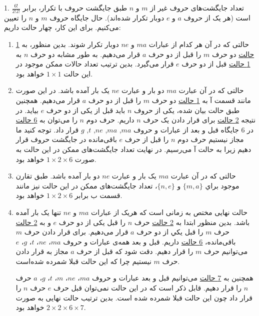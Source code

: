   
    1. 
    \p
    تعداد جایگشت‌های حروف غیر از $m$ و $n$ طبق جایگشت حروف با تکرار، برابر $\frac{6!}{2!2!}$ است
    (هر یک از حروف $a$ و $e$ دوبار تکرار شده‌اند).
    حال جایگاه حروف $m$ و $n$ را تعیین می‌کنیم.
    برای این کار، چهار حالت داریم:
    \begin{enumerate}
      \item 
      حالتی که در آن هر کدام از عبارات $ma$ و $ne$
      دوبار تکرار شوند. بدین منظور، به
      \underline{1 حالت} 
       دو حرف 
      $m$ 
      را قبل از دو حرف 
      $a$
      قرار می‌دهیم.
      به طور مشابه دو حرف
       $n$ 
     به
     \underline{1 حالت}
       قبل از دو حرف 
       $e$
       قرار می‌گیرد.
      بدین ترتیب تعداد حالات ممکن موجود در این حالت 
      $1\times1$
      خواهد بود.
      
      \item
      حالتی که در آن عبارت $ma$ دو بار و عبارت $ne$ 
      یک بار آمده باشد. در این صورت مانند قسمت آ به
      \underline{1 حالت}  
       دو حرف 
      $m$
      را قبل از دو حرف 
      $a$
      قرار می‌دهیم.
      همچنین طبق حالت بیان شده، یکی از حروف 
      $n$ باید قبل از یکی از دو حرف $e$
      بیاید. در نتیجه
      \underline{2 حالت}
      برای قرار دادن یک حرف $n$ داریم. 
       حرف دوم 
      $n$
      را می‌توان به 
      \underline{6 حالت}
       در 6 جایگاه قبل و بعد از عبارات و حروف
      $ma$, 
      $ma$, 
      $ne$, 
      $t$,   
      $g$
      قرار داد.
      توجه کنید ما مجاز نیستیم حرف دوم
      $n$
      را قبل از حرف $e$
      باقی‌مانده در جایگشت حروف قرار دهیم زیرا به حالت آ می‌رسیم.
     در نهایت تعداد جایگشت‌های ممکن در این حالت به صورت 
      $1\times 2\times 6$
      خواهد بود.

      \item
      حالتی که در آن عبارت $ma$ یک بار و عبارت $ne$
    دو بار آمده باشد.
      طبق تقارن موجود براي 
      $\{m,a\}$ و
      $\{n,e\}$، 
    تعداد جایگشت‌های ممکن در این حالت نیز مانند قسمت ب برابر 
    $1\times 2\times 6$ 
      خواهد بود.
      
      \item
      حالت نهایی مختص به زمانی است که هریک از عبارات $ma$ و $ne$ تنها یک بار آمده باشد.
      بدین منظور ابتدا به
      \underline{2 حالت}
      حرف 
      $n$
      را قبل یکی از دو حرف 
      $e$
      و به
      \underline{2 حالت}  
      حرف  
      $m$
      را قبل يكي از دو حرف 
      $a$ 
      قرار می‌دهیم.
      برای قرار دادن حرف $m$ باقی‌مانده،
      \underline{6 حالت} 
       داریم.
      قبل و بعد همه‌ی عبارات و حروف 
      $ma$، $ne$، $t$، $g$، $e$
      می‌توانیم حرف $m$ را قرار دهیم.
      دقت شود که قبل از حرف $a$ مجاز به قرار دادن حرف $m$ نیستیم چرا که این حالت قبلا شمرده شده‌است.

      همچنین به 
      \underline{7 حالت}
      می‌توانیم قبل و بعد عبارات و حروف
      $ma$،
      $ne$،
      $m$،
      $t$، $g$، $a$
      حرف $n$ را قرار دهیم.
      قابل ذکر است که در این حالت نمی‌توان قبل حرف $e$
      حرف $n$ را قرار داد چون این حالت قبلا شمرده شده است.
      بدین ترتیب حالت نهایی به صورت 
      $2\times 2 \times 6 \times 7$
      خواهد بود.
    \end{enumerate}
